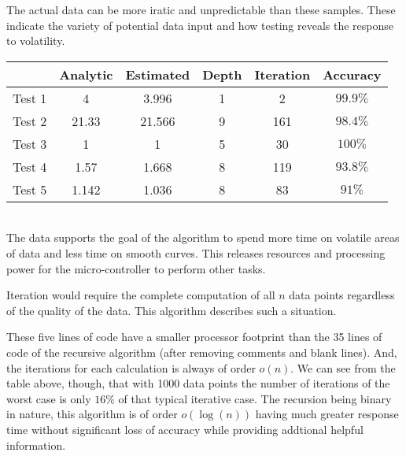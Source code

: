 \documentclass[12pt,a4paper]{report}
\begin{document}
The actual data can be more iratic and unpredictable than these samples.  These indicate the variety of potential data input and how testing reveals the response to volatility.\\

\begin{tabular}{|l|c|c|c|c|c|}
	\hline
	 	& Analytic &	 Estimated & Depth & Iteration & Accuracy \\
	 \hline
	 Test 1 & 4 & 3.996 & 1 & 2 & $99.9\%$\\
	 \hline
	 Test 2 & 21.33  & 21.566 & 9 & 161 & $98.4\%$\\
	 \hline
	 Test 3 & 1  & 1 & 5 & 30 & $100\%$\\
	 \hline
	 Test 4 & 1.57 & 1.668 & 8 & 119 & $93.8\%$\\
	 \hline
	 Test 5 & 1.142  & 1.036 & 8 & 83 & $91\%$ \\
	 \hline
\end{tabular}\\

The data supports the goal of the algorithm to spend more time on volatile areas of data and less time on smooth curves. This releases resources and processing power for the micro-controller to perform other tasks. \\


Iteration would require the complete computation of all $n$ data points regardless of the quality of the data.  This algorithm describes such a situation.



These five lines of code have a smaller processor footprint than the 35 lines of code of the recursive algorithm (after removing comments and blank lines).  And, the iterations for each calculation is always of order $o(n)$.  We can see from the table above, though, that with 1000 data points the number of iterations of the worst case is only $16\%$ of that typical iterative case.  The recursion being binary in nature, this algorithm is of order $o(\log(n))$ having much greater response time without significant loss of accuracy while providing addtional helpful information.\\


\end{document}
